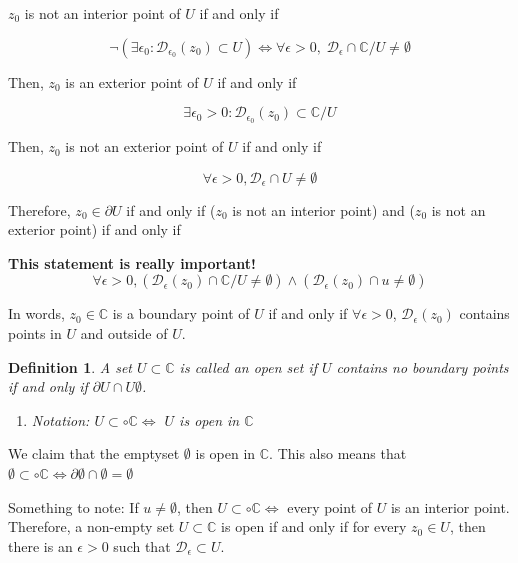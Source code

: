 \documentclass{article}
\newtheorem{definition}[theorem]{Definition}
\newtheorem{one minute paper}[theorem]{One Minute Paper}
\begin{document}
$z_0$ is not an interior point of $U$ if and only if 

\begin{equation}
    \lnot (\exists \epsilon_0: \mathcal{D}_{\epsilon_0}(z_0)\subset U) \iff \forall \epsilon > 0, \; \mathcal{D}_{\epsilon} \cap \mathbb{C}/U \neq \emptyset
\end{equation}

Then, $z_0$ is an exterior point of $U$ if and only if 

\begin{equation}
    \exists \epsilon_0 > 0: \mathcal{D}_{\epsilon_0}(z_0) \subset \mathbb{C}/U
\end{equation}

Then, $z_0$ is not an exterior point of $U$ if and only if 

\begin{equation}
    \forall \epsilon > 0, \mathcal{D}_{\epsilon} \cap U \neq \emptyset
\end{equation}

Therefore, $z_0 \in \partial U$ if and only if ($z_0$ is not an interior point) and ($z_0$ is not an exterior point) if and only if 

\textbf{This statement is really important!}
\begin{equation}
    \forall \epsilon > 0, \left( \mathcal{D}_{\epsilon}(z_0) \cap \mathbb{C}/U \neq \emptyset \right) \land \left( \mathcal{D}_{\epsilon}(z_0) \cap u \neq \emptyset \right)
\end{equation}

In words, $z_0 \in \mathbb{C}$ is a boundary point of $U$ if and only if $\forall \epsilon > 0$, $\mathcal{D}_{\epsilon}(z_0)$ contains points in $U$ and outside of $U$.

\begin{definition}
    A set $U \subset \mathbb{C}$ is called an open set if $U$ contains no boundary points if and only if $\partial U \cap U \emptyset$.
    \begin{enumerate}
        \item Notation: $U \subset \circ \mathbb{C} \iff$ $U$ is open in $\mathbb{C}$
    \end{enumerate}
\end{definition}

We claim that the emptyset $\emptyset$ is open in $\mathbb{C}$. This also means that $\emptyset \subset \circ \mathbb{C} \iff \partial \emptyset \cap \emptyset = \emptyset$

Something to note: If $u \neq \emptyset$, then $U \subset \circ \mathbb{C} \iff$ every point of $U$ is an interior point. Therefore, a non-empty set $U \subset \mathbb{C}$ is open if and only if for every $z_0 \in U$, then there is an $\epsilon >0$ such that $\mathcal{D}_{\epsilon} \subset U$.  
\end{document}
